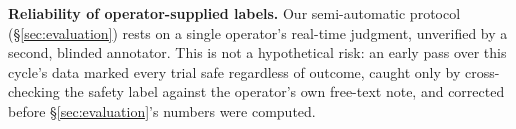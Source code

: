 \textbf{Reliability of operator-supplied labels.} Our semi-automatic
protocol (\S\ref{sec:evaluation}) rests on a single operator's real-time
judgment, unverified by a second, blinded annotator. This is not a
hypothetical risk: an early pass over this cycle's data marked every
trial safe regardless of outcome, caught only by cross-checking the
safety label against the operator's own free-text note, and corrected
before \S\ref{sec:evaluation}'s numbers were computed.
